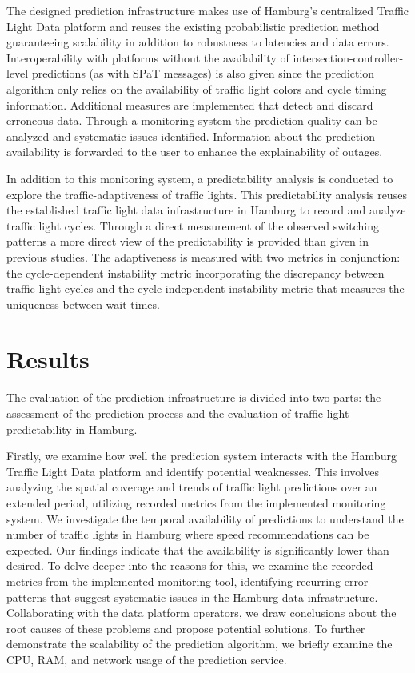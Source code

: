 \begin{Summary}
The designed prediction infrastructure makes use of Hamburg's centralized Traffic Light Data platform and reuses the existing probabilistic prediction method  \cite{pape_untersuchung_2012, protschky_extensive_2014, protschky_adaptive_2014} guaranteeing scalability in addition to robustness to latencies and data errors. Interoperability with platforms without the availability of intersection-controller-level predictions (as with SPaT messages) is also given since the prediction algorithm only relies on the availability of traffic light colors and cycle timing information. Additional measures are implemented that detect and discard erroneous data. Through a monitoring system the prediction quality can be analyzed and systematic issues identified. Information about the prediction availability is forwarded to the user to enhance the explainability of outages. 

In addition to this monitoring system, a predictability analysis is conducted to explore the traffic-adaptiveness of traffic lights. This predictability analysis reuses the established traffic light data infrastructure in Hamburg to record and analyze traffic light cycles. Through a direct measurement of the observed switching patterns a more direct view of the predictability is provided than given in previous studies. The adaptiveness is measured with two metrics in conjunction: the cycle-dependent instability metric incorporating the discrepancy between traffic light cycles and the cycle-independent instability metric that measures the uniqueness between wait times.
\end{Summary}

\section{Results}

The evaluation of the prediction infrastructure is divided into two parts: the assessment of the prediction process and the evaluation of traffic light predictability in Hamburg.

Firstly, we examine how well the prediction system interacts with the Hamburg Traffic Light Data platform and identify potential weaknesses. This involves analyzing the spatial coverage and trends of traffic light predictions over an extended period, utilizing recorded metrics from the implemented monitoring system. We investigate the temporal availability of predictions to understand the number of traffic lights in Hamburg where speed recommendations can be expected. Our findings indicate that the availability is significantly lower than desired. To delve deeper into the reasons for this, we examine the recorded metrics from the implemented monitoring tool, identifying recurring error patterns that suggest systematic issues in the Hamburg data infrastructure. Collaborating with the data platform operators, we draw conclusions about the root causes of these problems and propose potential solutions. To further demonstrate the scalability of the prediction algorithm, we briefly examine the CPU, RAM, and network usage of the prediction service.

